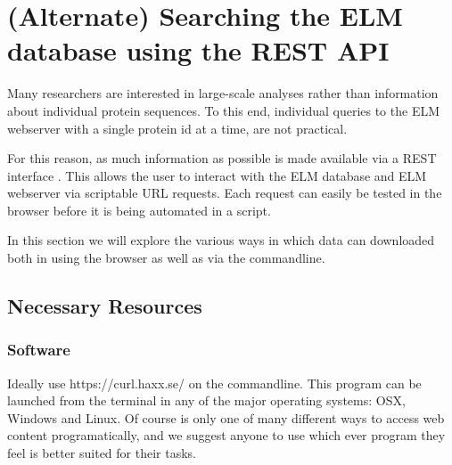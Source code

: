 \section{(Alternate) Searching the ELM database using the REST API}
\label{sec:search_REST}

Many researchers are interested in large-scale analyses rather than
information about individual protein sequences. To this end, individual
queries to the ELM webserver with a single protein id at a time, are not
practical.

For this reason, as much information as possible is made available via a
REST interface \cite{Fielding2002}. This allows the user to interact
with the ELM database and ELM webserver via scriptable URL requests.
Each request can easily be tested in the browser before it is being
automated in a script.

In this section we will explore the various ways in which data can
downloaded both in using the browser as well as via the commandline.

%
%
\subsection{Necessary Resources}

\subsubsection{Software}

Ideally use  https://curl.haxx.se/ on the commandline. This
program can be launched from the terminal in any of the major operating
systems: OSX, Windows and Linux. Of course  is only one of
many different ways to access web content programatically, and we
suggest anyone to use which ever program they feel is better suited for
their tasks.

